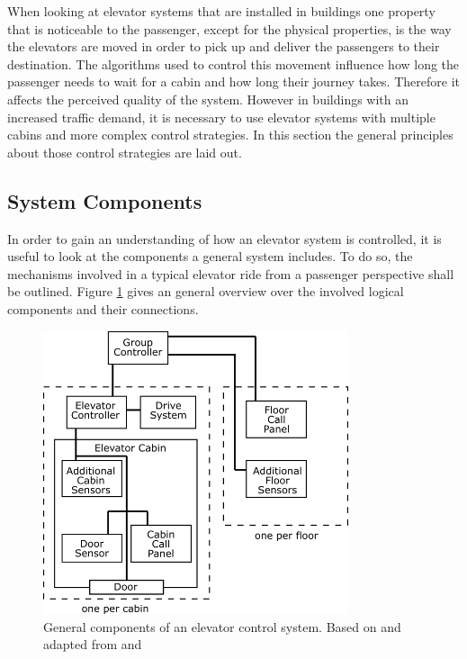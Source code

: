 When looking at elevator systems that are installed in buildings
one property that is noticeable to the passenger, except for the physical properties, is the way the elevators are moved in order to pick up and deliver the passengers to their destination.
The algorithms used to control this movement influence how long the passenger needs to wait for a cabin and how long their journey takes.
Therefore it affects the perceived quality of the system.
However in buildings with an increased traffic demand, it is necessary to use elevator systems with multiple cabins and more complex control strategies.
In this section the general principles about those control strategies are laid out.

\subsection{System Components}

In order to gain an understanding of how an elevator system is controlled,
it is useful to look at the components a general system includes.
To do so, the mechanisms involved in a typical elevator ride 
from a passenger perspective shall be outlined.
Figure \ref{fig:sota:systemcomponents} gives an general overview over the involved logical components and their connections.

\begin{figure}[hbt]
	\centering
	\includegraphics[width=0.8\textwidth, keepaspectratio]{resources/systemcomponets}
	\caption{\label{fig:sota:systemcomponents} General components of an elevator control system. Based on and adapted from \textcite[][pp.~4,16]{xang2016trafficlist} and  \textcite[][pp.10]{siikonen1997models}}
\end{figure}


